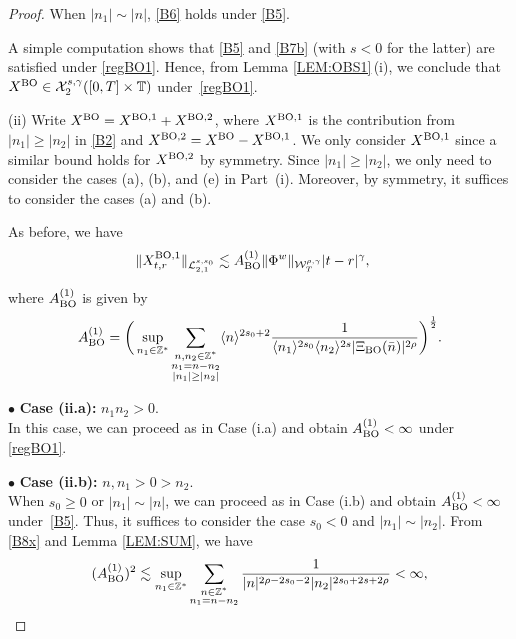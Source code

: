 \documentclass[letterpaper, 11pt,  reqno]{amsart}
\newcommand{\1}{\hspace{0.5mm}\text{I}\hspace{0.5mm}}
\newcommand{\noi}{\noindent}
\newcommand{\Z}{\mathbb{Z}}
\newcommand{\T}{\mathbb{T}}
\newcommand{\bul}{\bullet}
\newcommand{\g}{\gamma}
\newcommand{\les}{\lesssim}
\newcommand{\jb}[1]
{\langle #1 \rangle}
\newcommand{\cL}{\mathcal{L}}
\newcommand{\cX}{\mathcal{X}}
\newcommand{\W}{\mathcal{W}}
\newcommand{\BO}{\text{\rm BO} }
\numberwithin{equation}{section}
\numberwithin{theorem}{section}
\begin{document}
\begin{proof}
\noi
When $ |n_1| \sim |n|$, 
\eqref{B6} holds under 
 \eqref{B5}.



A simple computation shows that \eqref{B5}
and \eqref{B7b} (with $s < 0$ for the latter)
are satisfied under \eqref{regBO1}.
Hence,
from  Lemma \ref{LEM:OBS1}\,(i),  
we conclude that 
 $X^\BO\in  \cX^{s, \g}_2([0, T]\times \T)$ under~\eqref{regBO1}.



\medskip

\noi
(ii) 
 Write $X^\BO = X^{\BO, 1} + X^{\BO, 2}$, 
where $X^{\BO, 1}$ is the contribution from $|n_1| \ge |n_2|$ in \eqref{B2}
and $X^{\BO, 2} = X^\BO - X^{\BO, 1}$.
We only consider $X^{\BO, 1}$ since a similar bound holds for $X^{\BO, 2}$ by symmetry.
Since $|n_1| \ge |n_2|$, 
we only need to consider the cases (a), (b), and (e) in Part~(i).
Moreover, by symmetry, 
it suffices to consider the cases (a) and (b).



As before, we have 
\begin{align*}
\|X^{\BO, 1}_{t,r} \|_{\cL_{2, 1}^{s, s_0}}
&\les
A^{(1)}_\BO \| \Phi^w \|_{\W_T^{\rho,\g}} 
  |t-r|^{\g},  
\end{align*}

\noi
where $A^{(1)}_\BO$ is given by
\begin{align}
A^{(1)}_\BO = \bigg(\sup_{n_1 \in \Z^*}
\sum_{\substack{n, n_2 \in \Z^*\\n_1 = n - n_2\\|n_1|\ge |n_2|}} 
 \jb{n}^{2{s_0} + 2}
 \frac{1}{\jb{n_1}^{2{s_0}} \jb{n_2}^{2s} |  \Xi_\BO (\bar n)|^{2\rho}}\bigg)^\frac 12.
\label{B8x}
\end{align}


\medskip

\noi
$\bul$ {\bf Case (ii.a):} $n_1 n_2 >0$.\\
\indent
In this case, we can proceed as in Case (i.a) 
and obtain 
$A^{(1)}_\BO < \infty$ under  \eqref{regBO1}.


\medskip

\noi
$\bul$ {\bf Case (ii.b):} $n, n_1>0>n_2$.\\
\indent
When $s_0 \ge 0$ or $|n_1| \sim |n|$, 
we  can proceed as in Case (i.b) 
and obtain 
$A^{(1)}_\BO < \infty$ under~\eqref{B5}.
Thus, it suffices to consider the case 
$s_0 < 0$ and $ |n_1| \sim |n_2|$.
From \eqref{B8x} and Lemma \ref{LEM:SUM}, we have 
\begin{align*}
(A_\BO^{(1)})^2\les  
\sup_{n_1\in \Z^*}
\sum_{\substack{n\in \Z^*\\ n_1 = n- n_2}}    
 \frac{ 1 }{  |n|^{ 2\rho -2s_0 - 2}  | n_2|^{2s_0 + 2s +2\rho} }
< \infty, 
\end{align*}


\end{proof}
\end{document}
